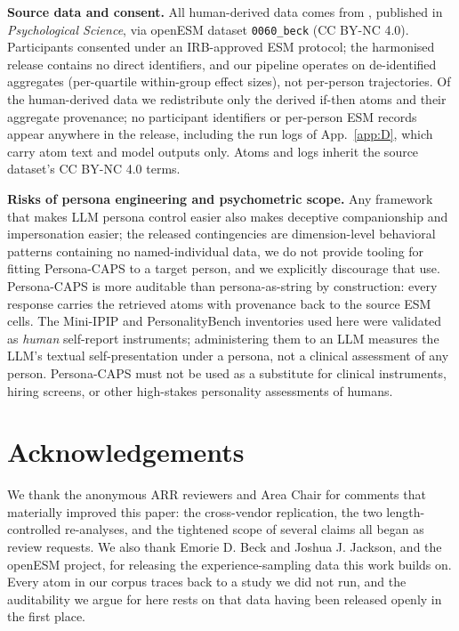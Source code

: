 \textbf{Source data and consent.} All human-derived data comes from \citet{beck2022esm}, published in \textit{Psychological Science}, via openESM dataset \texttt{0060\_\allowbreak{}beck} (CC BY-NC 4.0). Participants consented under an IRB-approved ESM protocol; the harmonised release contains no direct identifiers, and our pipeline operates on de-identified aggregates (per-quartile within-group effect sizes), not per-person trajectories. Of the human-derived data we redistribute only the derived if-then atoms and their aggregate provenance; no participant identifiers or per-person ESM records appear anywhere in the release, including the run logs of App.~\ref{app:D}, which carry atom text and model outputs only. Atoms and logs inherit the source dataset's CC BY-NC 4.0 terms.

\textbf{Risks of persona engineering and psychometric scope.} Any framework that makes LLM persona control easier also makes deceptive companionship and impersonation easier; the released contingencies are dimension-level behavioral patterns containing no named-individual data, we do not provide tooling for fitting Persona-CAPS to a target person, and we explicitly discourage that use. Persona-CAPS is more auditable than persona-as-string by construction: every response carries the retrieved atoms with provenance back to the source ESM cells. The Mini-IPIP and PersonalityBench inventories used here were validated as \textit{human} self-report instruments; administering them to an LLM measures the LLM's textual self-presentation under a persona, not a clinical assessment of any person. Persona-CAPS must not be used as a substitute for clinical instruments, hiring screens, or other high-stakes personality assessments of humans.

\label{sec:acks}
\section*{Acknowledgements}

We thank the anonymous ARR reviewers and Area Chair for comments that materially improved this paper: the cross-vendor replication, the two length-controlled re-analyses, and the tightened scope of several claims all began as review requests. We also thank Emorie D. Beck and Joshua J. Jackson, and the openESM project, for releasing the experience-sampling data this work builds on. Every atom in our corpus traces back to a study we did not run, and the auditability we argue for here rests on that data having been released openly in the first place.

